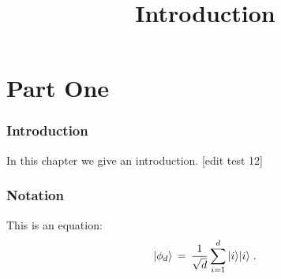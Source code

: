 

%


\title{Introduction}
\label{introduction}


\maketitle


\tableofcontents

\part{Part One}
\label{one}

\section{Introduction}
\label{section:introduction}

In this chapter we give an introduction. [edit test 12]

\section{Notation}
\label{section-notation}

This is an equation:
\begin{equation}
\label{eq:me-state}
 |\phi_d\rangle \,=\,\frac{1}{\sqrt{d}} \sum_{i=1}^d |i\rangle|i\rangle\;.
\end{equation}








